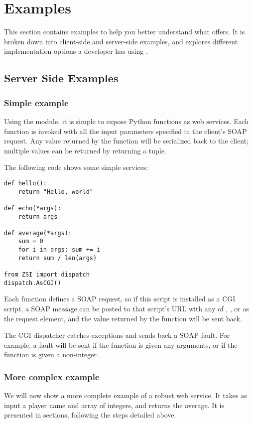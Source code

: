\chapter{Examples}

This section contains examples to help you better understand what \ZSI{}
offers.  It is broken down into client-side and server-side examples, and
explores different implementation options a developer has using \ZSI{}.

\section{Server Side Examples}
\subsection{Simple example}
Using the  module, it is simple to expose Python
functions as web services.
Each function is invoked with all the input parameters specified in the
client's SOAP request.
Any value returned by the function will be serialized back to the client;
multiple values can be returned by returning a tuple.

The following code shows some simple services:

\begin{verbatim}
def hello():
    return "Hello, world"

def echo(*args):
    return args

def average(*args):
    sum = 0
    for i in args: sum += i
    return sum / len(args)

from ZSI import dispatch
dispatch.AsCGI()
\end{verbatim}

Each function defines a SOAP request, so if this script is installed
as a CGI script, a SOAP message can be posted to that script's URL with any of
, , or  as the request element,
and the value returned by the function will be sent back.

The \ZSI{} CGI dispatcher catches exceptions and sends back a SOAP fault.
For example, a fault will be sent if the   function is given any
arguments, or if the  function is given a non-integer.

\subsection{More complex example}

We will now show a more complete example of a robust web service.
It takes as input a player name and array of integers, and returns
the average.
It is presented in sections, following the steps detailed above.

